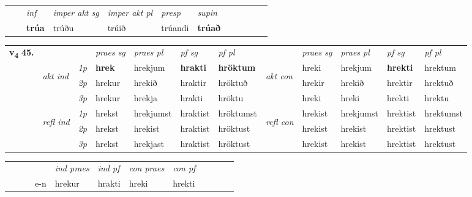 \begin{tabular}{llllllllllll}
 & & \textit{inf} & \textit{imper akt sg} & \textit{imper akt pl}   & \textit{presp} & \textit{supin}       \\*
  & & \textbf{trúa} & trúðu  & trúið   & trúandi &  \textbf{trúað}   \\*
\cmidrule{1-12}
\end{tabular}



\begin{tabular}{llllllllllll} \toprule
\multirow{4}{*}{{{\textbf{v{\textsubscript{4}}} \Large{\textbf{45.}}}}}  & &   &  \textit{praes sg}  & \textit{praes pl}  &\textit{ pf sg} & \textit{pf pl} &  &  \textit{praes sg}  & \textit{praes pl}  & \textit{pf sg} & \textit{pf pl } \\*
	\cmidrule{4-7} \cmidrule{9-12}
 & \multirow{3}{*}{\begin{turn}{90}\textit{akt ind}\end{turn}} & {\textit{1p}} & \textbf{hrek} & hrekjum    & \textbf{hrakti} & \textbf{hröktum} & \multirow{3}{*}{\begin{turn}{90}\textit{akt con}\end{turn}} &hreki & hrekjum & \textbf{hrekti} & hrektum\\*
& &  {\textit{2p}} &  hrekur  & hrekið   & hraktir & hröktuð & & hrekir & hrekið & hrektir & hrektuð \\*
& &  {\textit{3p}} & hrekur & hrekja   & hrakti & hröktu & & hreki & hreki& hrekti & hrektu  \\*
\cmidrule{4-7} \cmidrule{9-12}
 &\multirow{3}{*}{\begin{turn}{90}\textit{refl ind}\end{turn}} & {\textit{1p}} & hrekst & hrekjumst    & hraktist & hröktumst & \multirow{3}{*}{\begin{turn}{90}\textit{refl con}\end{turn}}  &hrekist & hrekjumst & hrektist & hrektumst\\*
 &&  {\textit{2p}} &  hrekst  & hrekist   & hraktist & hröktust & &hrekist & hrekist & hrektist & hrektust \\*
& &  {\textit{3p}} & hrekst & hrekjast   & hraktist & hröktust & & hrekist & hrekist& hrektist & hrektust  \\*
\cmidrule{4-7} \cmidrule{9-12}
\end{tabular}


\begin{tabular}{llllllllllll}
 & &  & &  \textit{ind praes} & \textit{ind pf} & \textit{con praes} & \textit{con pf} \\*
&  & & e-n & hrekur & hrakti & hreki & hrekti \\*
\cmidrule{5-9}
\end{tabular}


